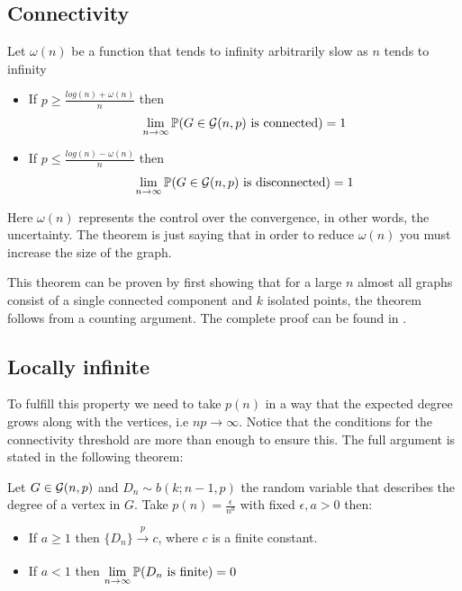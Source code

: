 \subsection{Connectivity}
\begin{theorem}\label{connectivityER}
Let $\omega(n)$ be a function that tends to infinity arbitrarily slow as $n$ tends to infinity
\begin{itemize}
\item If $p\geq \frac{log(n)+ \omega(n)}{n}$ then 
$$\lim_{n \to \infty} \P(G \in \G(n,p) \text{ is connected}) = 1$$
\item If $p\leq \frac{log(n)- \omega(n)}{n}$ then
$$\lim_{n \to \infty} \P(G \in \G(n,p) \text{ is disconnected}) = 1$$
\end{itemize}
\end{theorem}

Here $\omega(n)$ represents the control over the convergence, in other words, the uncertainty. The theorem is just saying that in order to reduce $\omega(n)$ you must increase the size of the graph.

This theorem can be proven by first showing that for a large $n$ almost all graphs consist of a single connected component and $k$ isolated points, the theorem follows from a counting argument. The complete proof can be found in \cite[Erdös-Rényi, p.~59]{Erdos59}.
 
\subsection{Locally infinite}

To fulfill this property we need to take $p(n)$ in a way that the expected degree grows along with the vertices, i.e $n p\to \infty$. Notice that the conditions for the connectivity threshold are more than enough to ensure this. The full argument is stated in the following theorem:

\begin{theorem}\label{locallyInfiniteER}
Let $G \in \G(n,p)$ and $D_{n} \sim b(k; n-1,p)$ the random variable that describes the degree of a vertex in $G$. Take $p(n)=\frac{\epsilon}{n^{a}}$ with fixed $\epsilon,a >0$ then:
\begin{itemize}
    \item If $a\geq 1$ then $\{D_{n}\} \xrightarrow[]{p} c $, where $c$ is a finite constant.
    \item If $a<1$ then $\lim\limits_{n \to \infty} \P(D_n \text{ is finite}) = 0$
\end{itemize}
\end{theorem}

